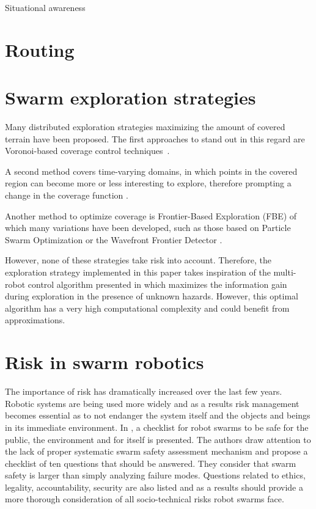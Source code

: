 Situational awareness \cite{jones2020distributed}

\section{Routing}


\section{Swarm exploration strategies}
Many distributed exploration strategies maximizing the amount of
covered terrain have been proposed. The first approaches to stand out
in this regard are Voronoi-based coverage control
techniques~\cite{luo2019voronoi,santos2019decentralized}.

A second method covers time-varying domains, in which points in the
covered region can become more or less interesting to explore,
therefore prompting a change in the coverage function
\cite{santos2019decentralized,xu2019multi}. 

Another method to optimize
coverage is Frontier-Based Exploration (FBE)
\cite{yamauchi1998frontier} of which many variations have been
developed, such as those based on Particle Swarm Optimization
\cite{wang2011frontier} or the Wavefront Frontier Detector
\cite{topiwala2018frontier}. 

However, none of these strategies take
risk into account. Therefore, the
exploration strategy implemented in this paper takes inspiration of
the multi-robot control algorithm presented in
\cite{dames2012decentralized,schwagerMultirobotControlPolicy2017}
which maximizes the information gain during exploration in the
presence of unknown hazards. However, this optimal algorithm has a
very high computational complexity and could benefit from approximations.






\section{Risk in swarm robotics}
The importance of risk has dramatically increased over the last few years. Robotic systems are being used more widely and as a results risk management becomes essential as to not endanger the system itself and the objects and beings in its immediate environment. In \cite{hunt2020checklist}, a checklist for robot swarms to be safe for the public, the environment and for itself is presented. The authors draw attention to the lack of proper systematic swarm safety assessment mechanism and propose a checklist of ten questions that should be answered. They consider that swarm safety is larger than simply analyzing failure modes. Questions related to ethics, legality, accountability, security are also listed and as a results should provide a more thorough consideration of all socio-technical risks robot swarms face. 


